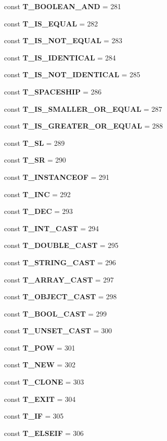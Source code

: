 \begin{DoxyCompactItemize}
\item 
const {\bf T\+\_\+\+B\+O\+O\+L\+E\+A\+N\+\_\+\+A\+N\+D} = 281
\item 
const {\bf T\+\_\+\+I\+S\+\_\+\+E\+Q\+U\+A\+L} = 282
\item 
const {\bf T\+\_\+\+I\+S\+\_\+\+N\+O\+T\+\_\+\+E\+Q\+U\+A\+L} = 283
\item 
const {\bf T\+\_\+\+I\+S\+\_\+\+I\+D\+E\+N\+T\+I\+C\+A\+L} = 284
\item 
const {\bf T\+\_\+\+I\+S\+\_\+\+N\+O\+T\+\_\+\+I\+D\+E\+N\+T\+I\+C\+A\+L} = 285
\item 
const {\bf T\+\_\+\+S\+P\+A\+C\+E\+S\+H\+I\+P} = 286
\item 
const {\bf T\+\_\+\+I\+S\+\_\+\+S\+M\+A\+L\+L\+E\+R\+\_\+\+O\+R\+\_\+\+E\+Q\+U\+A\+L} = 287
\item 
const {\bf T\+\_\+\+I\+S\+\_\+\+G\+R\+E\+A\+T\+E\+R\+\_\+\+O\+R\+\_\+\+E\+Q\+U\+A\+L} = 288
\item 
const {\bf T\+\_\+\+S\+L} = 289
\item 
const {\bf T\+\_\+\+S\+R} = 290
\item 
const {\bf T\+\_\+\+I\+N\+S\+T\+A\+N\+C\+E\+O\+F} = 291
\item 
const {\bf T\+\_\+\+I\+N\+C} = 292
\item 
const {\bf T\+\_\+\+D\+E\+C} = 293
\item 
const {\bf T\+\_\+\+I\+N\+T\+\_\+\+C\+A\+S\+T} = 294
\item 
const {\bf T\+\_\+\+D\+O\+U\+B\+L\+E\+\_\+\+C\+A\+S\+T} = 295
\item 
const {\bf T\+\_\+\+S\+T\+R\+I\+N\+G\+\_\+\+C\+A\+S\+T} = 296
\item 
const {\bf T\+\_\+\+A\+R\+R\+A\+Y\+\_\+\+C\+A\+S\+T} = 297
\item 
const {\bf T\+\_\+\+O\+B\+J\+E\+C\+T\+\_\+\+C\+A\+S\+T} = 298
\item 
const {\bf T\+\_\+\+B\+O\+O\+L\+\_\+\+C\+A\+S\+T} = 299
\item 
const {\bf T\+\_\+\+U\+N\+S\+E\+T\+\_\+\+C\+A\+S\+T} = 300
\item 
const {\bf T\+\_\+\+P\+O\+W} = 301
\item 
const {\bf T\+\_\+\+N\+E\+W} = 302
\item 
const {\bf T\+\_\+\+C\+L\+O\+N\+E} = 303
\item 
const {\bf T\+\_\+\+E\+X\+I\+T} = 304
\item 
const {\bf T\+\_\+\+I\+F} = 305
\item 
const {\bf T\+\_\+\+E\+L\+S\+E\+I\+F} = 306

\end{DoxyCompactItemize}
